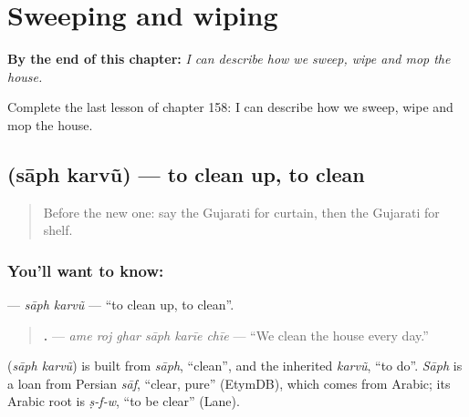 
\chapter{Sweeping and wiping}
\label{ch:gu-sweeping-and-wiping}

\begin{chapteropening}
\textbf{By the end of this chapter:} \emph{I can describe how we sweep, wipe and mop the house.}

Complete the last lesson of chapter 158: I can describe how we sweep, wipe and mop the house.
\end{chapteropening}

\section[\texorpdfstring{\gu{સાફ} \gu{કરવું} (sāph karvũ)}{સાફ કરવું (sāph karvũ)}]{  (sāph karvũ) — to clean up, to clean}

\label{lesson:GU-C158-saph-karvu}



\begin{quote}
Before the new one: say the Gujarati for curtain, then the Gujarati for shelf.
\end{quote}

\subsection*{You'll want to know:  }
\textbf{ } — \emph{sāph karvũ} — \textquotedblleft{}to clean up, to clean\textquotedblright{}.

\begin{quote}
\textbf{     .} — \emph{ame roj ghar sāph karīe chīe} — \textquotedblleft{}We clean the house every day.\textquotedblright{}
\end{quote}

\begin{cousinweb}
\textbf{ } (\emph{sāph karvũ}) is built from \emph{sāph}, \textquotedblleft{}clean\textquotedblright{}, and the inherited \emph{karvũ}, \textquotedblleft{}to do\textquotedblright{}. \emph{Sāph} is a loan from Persian \emph{sāf}, \textquotedblleft{}clear, pure\textquotedblright{} (EtymDB), which comes from Arabic; its Arabic root is \emph{ṣ-f-w}, \textquotedblleft{}to be clear\textquotedblright{} (Lane).
\end{cousinweb}

